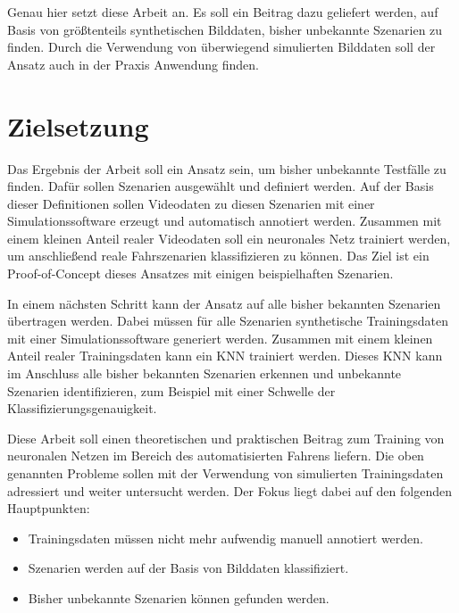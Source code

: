 Genau hier setzt diese Arbeit an. Es soll ein Beitrag dazu geliefert werden, auf Basis von größtenteils synthetischen Bilddaten, bisher unbekannte Szenarien zu finden. Durch die Verwendung von überwiegend simulierten Bilddaten soll der Ansatz auch in der Praxis Anwendung finden.


\section{Zielsetzung}
\label{einleitung_zielsetzung}

Das Ergebnis der Arbeit soll ein Ansatz sein, um bisher unbekannte Testfälle zu finden. Dafür sollen Szenarien ausgewählt und definiert werden. Auf der Basis dieser Definitionen sollen Videodaten zu diesen Szenarien mit einer Simulationssoftware erzeugt und automatisch annotiert werden. Zusammen mit einem kleinen Anteil realer Videodaten soll ein neuronales Netz trainiert werden, um anschließend reale Fahrszenarien klassifizieren zu können. Das Ziel ist ein Proof-of-Concept dieses Ansatzes mit einigen beispielhaften Szenarien.

In einem nächsten Schritt kann der Ansatz auf alle bisher bekannten Szenarien übertragen werden. Dabei müssen für alle Szenarien synthetische Trainingsdaten mit einer Simulationssoftware generiert werden. Zusammen mit einem kleinen Anteil realer Trainingsdaten kann ein \ac{KNN} trainiert werden. Dieses \ac{KNN} kann im Anschluss alle bisher bekannten Szenarien erkennen und unbekannte Szenarien identifizieren, zum Beispiel mit einer Schwelle der Klassifizierungsgenauigkeit.

Diese Arbeit soll einen theoretischen und praktischen Beitrag zum Training von neuronalen Netzen im Bereich des automatisierten Fahrens liefern. Die oben genannten Probleme sollen mit der Verwendung von simulierten Trainingsdaten adressiert und weiter untersucht werden. Der Fokus liegt dabei auf den folgenden Hauptpunkten:

\begin{itemize}
\item Trainingsdaten müssen nicht mehr aufwendig manuell annotiert werden.
\item Szenarien werden auf der Basis von Bilddaten klassifiziert.
\item Bisher unbekannte Szenarien können gefunden werden.
\end{itemize}

